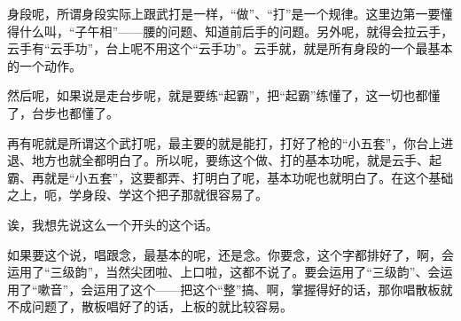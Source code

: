 \textrm{身段呢，所谓身段实际上跟武打是一样，``做''、``打''是一个规律。这里边第一要懂得什么叫，``子午相''------腰的问题、知道前后手的问题。另外呢，就得会拉云手，云手有``云手功''，台上呢不用这个``云手功''。云手就，就是所有身段的一个最基本的一个动作。}

\textrm{然后呢，如果说是走台步呢，就是要练``起霸''，把``起霸''练懂了，这一切也都懂了，台步也都懂了。}

\textrm{再有呢就是所谓这个武打呢，最主要的就是能打，打好了枪的``小五套''，你台上进退、地方也就全都明白了。所以呢，要练这个做、打的基本功呢，就是云手、起霸、再就是``小五套''，这要都弄、打明白了呢，基本功呢也就明白了。在这个基础之上，呃，学身段、学这个把子那就很容易了。}

\textrm{诶，我想先说这么一个开头的这个话。}

\textrm{如果要这个说，唱跟念，最基本的呢，还是念。你要念，这个字都排好了，啊，会运用了``三级韵''，当然尖团啦、上口啦，这都不说了。要会运用了``三级韵''、会运用了``嗽音''，会运用了这个------把这个``整''搞、啊，掌握得好的话，那你唱散板就不成问题了，散板唱好了的话，上板的就比较容易。}

